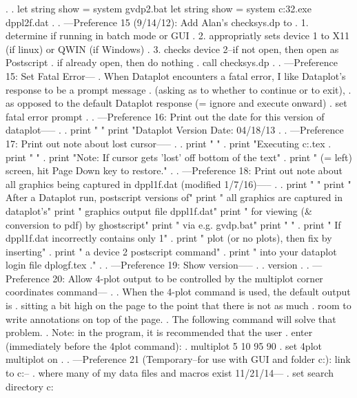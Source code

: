 .
. let string show = system gvdp2.bat
let string show = system c:\ghostgum\gsview\gsview32.exe dppl2f.dat
.
. ---Preference 15 (9/14/12): Add Alan's checksys.dp to
.                             1. determine if running in batch mode or GUI
.                             2. appropriatly sets device 1 to X11 (if linux) or QWIN (if Windows)
.                             3. checks device 2--if not open, then open as Postscript
.                                                 if already open, then do nothing
. call checksys.dp
.
. ---Preference 15: Set Fatal Error---
.    When Dataplot encounters a fatal error, I like Dataplot's response to be a prompt message
.    (asking as to whether to continue or to exit),
.    as opposed to the default Dataplot response (= ignore and execute onward)
.
set fatal error prompt
.
. ---Preference 16: Print out the date for this version of dataplot-----
.
. print " "
print "Dataplot Version Date: 04/18/13
.
. ---Preference 17: Print out note about lost cursor-----
.
. print " "
. print "Executing c:\0\dpx\folder.tex
. print " "
. print "Note: If cursor gets 'lost' off bottom of the text"
. print "      (= left) screen, hit  Page Down  key to restore."
.
. ---Preference 18: Print out note about all graphics being captured in dppl1f.dat (modified 1/7/16)-----
.
. print " "
print "      After a Dataplot run, postscript versions of"
print "      all graphics are captured in dataplot's"
print "      graphics output file     dppl1f.dat"
print "      for viewing (& conversion to pdf) by ghostscript"
print "      via e.g.    gvdp.bat"
print " "
. print "      If   dppl1f.dat   incorrectly contains only 1"
. print "      plot (or no plots), then fix by inserting"
. print "      a   device 2 postscript    command"
. print "      into your dataplot login file   dplogf.tex  ."
.
. ---Preference 19: Show version-----
.
. version
.
. ---Preference 20: Allow 4-plot output to be controlled by the    multiplot corner coordinates    command---
.
.    When the 4-plot command is used, the default output is
.    sitting a bit high on the page to the point that there is not as much
.    room to write annotations on top of the page.
.    The following command will solve that problem.
.    Note: in the program, it is recommended that the user
.          enter (immediately before the 4plot command):
.             multiplot 5 10 95 90
.
set 4plot multiplot on
.
. ---Preference 21 (Temporary--for use with GUI and folder c:\0\dpx): link to c:\0\---
.                   where many of my data files and macros exist     11/21/14---
.
set search directory c:\0\
